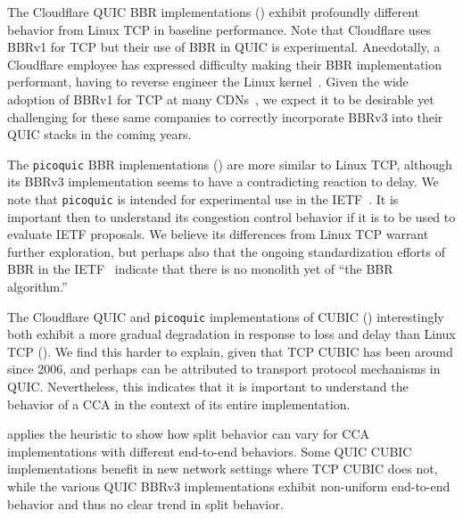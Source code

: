 The Cloudflare QUIC BBR implementations ()
exhibit profoundly different behavior from Linux TCP in baseline performance.
Note that Cloudflare uses BBRv1 for TCP but their use of BBR in QUIC
is experimental. Anecdotally, a
Cloudflare employee has expressed difficulty making
their BBR implementation performant, having to reverse engineer
the Linux kernel~\cite{cardwell2024bbrv3-ietf119-qna}. Given the wide adoption
of BBRv1 for TCP at many CDNs~\cite{ware2024ccanalyzer}, we expect it to
be desirable yet challenging for these same companies to correctly incorporate
BBRv3 into their QUIC stacks in the coming years.

The \texttt{picoquic} BBR implementations ()
are more similar to Linux TCP, although its BBRv3 implementation seems to have
a contradicting reaction to delay.
We note that \texttt{picoquic} is intended for experimental use in the
IETF~\cite{picoquic}. It is important then to understand its congestion control
behavior if it is to be used to evaluate
IETF proposals. We believe its differences from Linux TCP warrant further
exploration, but perhaps also that the ongoing standardization efforts of BBR
in the IETF~\cite{cardwell2024bbr-ietf-draft} indicate
that there is no monolith yet of ``the BBR algorithm.''

The Cloudflare QUIC and \texttt{picoquic} implementations of CUBIC
() interestingly
both exhibit a more gradual degradation in response to loss and delay than Linux TCP
(). We
find this harder to explain, given that TCP CUBIC has been around since 2006,
and perhaps can be attributed to transport protocol mechanisms in QUIC.
Nevertheless, this indicates that it is important to understand the
behavior of a CCA in the context of its entire
implementation.



 applies the heuristic to show how split behavior
can vary for CCA implementations with different end-to-end behaviors.
Some QUIC CUBIC implementations
benefit in new network settings where TCP CUBIC does not, while the various
QUIC BBRv3 implementations exhibit non-uniform end-to-end behavior and thus no
clear trend in split behavior.

